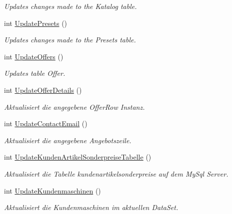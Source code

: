 \begin{DoxyCompactItemize}
\begin{DoxyCompactList}\small\item\em Updates changes made to the Katalog table. \end{DoxyCompactList}\item 
int \hyperlink{class_products_1_1_data_1_1_data_service_a3ea4dc20b2c7ac48fc644447f528222b}{Update\+Presets} ()
\begin{DoxyCompactList}\small\item\em Updates changes made to the Presets table. \end{DoxyCompactList}\item 
int \hyperlink{class_products_1_1_data_1_1_data_service_a1e349fad6a68db0cdd49d5fa6fe2e217}{Update\+Offers} ()
\begin{DoxyCompactList}\small\item\em Updates table Offer. \end{DoxyCompactList}\item 
int \hyperlink{class_products_1_1_data_1_1_data_service_a06b3cb7a0dfeb51eb953182840545717}{Update\+Offer\+Details} ()
\begin{DoxyCompactList}\small\item\em Aktualisiert die angegebene Offer\+Row Instanz. \end{DoxyCompactList}\item 
int \hyperlink{class_products_1_1_data_1_1_data_service_a1ab0cb25f164f6ef62805e31120e0ee0}{Update\+Contact\+Email} ()
\begin{DoxyCompactList}\small\item\em Aktualisiert die angegebene Angebotszeile. \end{DoxyCompactList}\item 
int \hyperlink{class_products_1_1_data_1_1_data_service_a3224af9a7b6e9b2c241de4c7bea8125e}{Update\+Kunden\+Artikel\+Sonderpreise\+Tabelle} ()
\begin{DoxyCompactList}\small\item\em Aktualisiert die Tabelle kundenartikelsonderpreise auf dem My\+Sql Server. \end{DoxyCompactList}\item 
int \hyperlink{class_products_1_1_data_1_1_data_service_ad35df5538efa3a8c541e0ecb34e4652f}{Update\+Kundenmaschinen} ()
\begin{DoxyCompactList}\small\item\em Aktualisiert die Kundenmaschinen im aktuellen Data\+Set. \end{DoxyCompactList}\item 

\end{DoxyCompactItemize}
